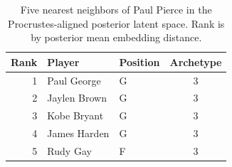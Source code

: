 \begin{table}[htbp]
  \centering\small
  \begin{tabular}{rllc}
    \toprule
    Rank & Player & Position & Archetype \\
    \midrule
    1 & Paul George & G & 3 \\
    2 & Jaylen Brown & G & 3 \\
    3 & Kobe Bryant & G & 3 \\
    4 & James Harden & G & 3 \\
    5 & Rudy Gay & F & 3 \\
    \bottomrule
  \end{tabular}
  \caption{Five nearest neighbors of Paul Pierce in the Procrustes-aligned posterior latent space. Rank is by posterior mean embedding distance.}
  \label{tab:Paul_Pierce_neighbors}
\end{table}

